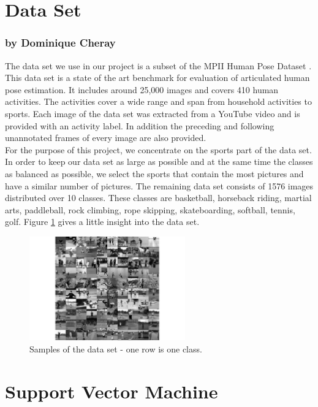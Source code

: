 \documentclass[11pt]{report}
\begin{document}
\section{Data Set}
\label{dataset}
\subsubsection{by Dominique Cheray}
The data set we use in our project is a subset of the MPII Human Pose Dataset
\cite{andriluka20142d}. This data set is a state of the art benchmark for
evaluation of articulated human pose estimation. It includes around
25,000 images and covers 410 human activities. The activities cover a wide range
and span from household activities to sports. Each image
of the data set was extracted from a YouTube video and is provided with an
activity label. In addition the preceding and following unannotated frames of
every image are also provided. \\
For the purpose of this project, we concentrate on the sports part of the
data set. In order to keep our data set as large as possible and at the same
time the classes as balanced as possible, we select the sports that contain the most
pictures and have a similar number of pictures. The remaining data set consists of
1576 images distributed over 10 classes. These classes are basketball, horseback
riding, martial arts, paddleball, rock climbing, rope skipping, skateboarding,
softball, tennis, golf. Figure \ref{plotgrid} gives a little insight into the
data set. 
\begin{figure}
  \centering
  \includegraphics[width=0.6\textwidth]{plotgrid}
  \caption{Samples of the data set - one row is one class.}
  \label{plotgrid}
\end{figure}

\section {Support Vector Machine}
\label{SVM}
\end{document}
